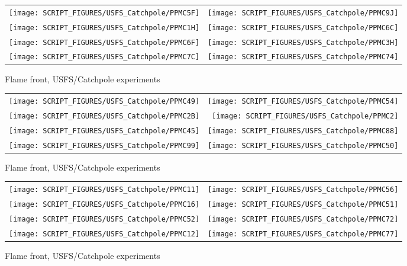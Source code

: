 \begin{figure}[p]
\begin{tabular*}{\textwidth}{l@{\extracolsep{\fill}}r}
\texttt{[image: SCRIPT\_FIGURES/USFS\_Catchpole/PPMC5F]} &
\texttt{[image: SCRIPT\_FIGURES/USFS\_Catchpole/PPMC9J]} \\
\texttt{[image: SCRIPT\_FIGURES/USFS\_Catchpole/PPMC1H]} &
\texttt{[image: SCRIPT\_FIGURES/USFS\_Catchpole/PPMC6C]} \\
\texttt{[image: SCRIPT\_FIGURES/USFS\_Catchpole/PPMC6F]} &
\texttt{[image: SCRIPT\_FIGURES/USFS\_Catchpole/PPMC3H]} \\
\texttt{[image: SCRIPT\_FIGURES/USFS\_Catchpole/PPMC7C]} &
\texttt{[image: SCRIPT\_FIGURES/USFS\_Catchpole/PPMC74]} \\
\end{tabular*}
\caption[Flame front, USFS/Catchpole experiments]{Flame front, USFS/Catchpole experiments}
\label{USFS_Catchpole_184}
\end{figure}

\begin{figure}[p]
\begin{tabular*}{\textwidth}{l@{\extracolsep{\fill}}r}
\texttt{[image: SCRIPT\_FIGURES/USFS\_Catchpole/PPMC49]} &
\texttt{[image: SCRIPT\_FIGURES/USFS\_Catchpole/PPMC54]} \\
\texttt{[image: SCRIPT\_FIGURES/USFS\_Catchpole/PPMC2B]} &
\texttt{[image: SCRIPT\_FIGURES/USFS\_Catchpole/PPMC2]} \\
\texttt{[image: SCRIPT\_FIGURES/USFS\_Catchpole/PPMC45]} &
\texttt{[image: SCRIPT\_FIGURES/USFS\_Catchpole/PPMC88]} \\
\texttt{[image: SCRIPT\_FIGURES/USFS\_Catchpole/PPMC99]} &
\texttt{[image: SCRIPT\_FIGURES/USFS\_Catchpole/PPMC50]} \\
\end{tabular*}
\caption[Flame front, USFS/Catchpole experiments]{Flame front, USFS/Catchpole experiments}
\label{USFS_Catchpole_192}
\end{figure}

\begin{figure}[p]
\begin{tabular*}{\textwidth}{l@{\extracolsep{\fill}}r}
\texttt{[image: SCRIPT\_FIGURES/USFS\_Catchpole/PPMC11]} &
\texttt{[image: SCRIPT\_FIGURES/USFS\_Catchpole/PPMC56]} \\
\texttt{[image: SCRIPT\_FIGURES/USFS\_Catchpole/PPMC16]} &
\texttt{[image: SCRIPT\_FIGURES/USFS\_Catchpole/PPMC51]} \\
\texttt{[image: SCRIPT\_FIGURES/USFS\_Catchpole/PPMC52]} &
\texttt{[image: SCRIPT\_FIGURES/USFS\_Catchpole/PPMC72]} \\
\texttt{[image: SCRIPT\_FIGURES/USFS\_Catchpole/PPMC12]} &
\texttt{[image: SCRIPT\_FIGURES/USFS\_Catchpole/PPMC77]} \\
\end{tabular*}
\caption[Flame front, USFS/Catchpole experiments]{Flame front, USFS/Catchpole experiments}
\label{USFS_Catchpole_200}
\end{figure}

